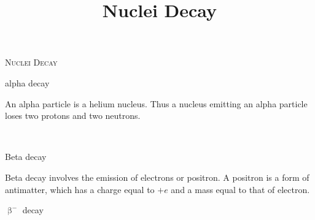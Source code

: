 \documentclass[12 pt]{book}
\title{Nuclei Decay}
\date{}
\newcommand*\Times{\fontfamily{ptm}\selectfont}
\newenvironment{my-title}
{
	\begin{center}
	\begin{itshape}
	\Large\Times\textit{}
}
{
	\end{itshape}
	\end{center}
}
\newenvironment{definition}
{
	\begin{center}
	\begin{itshape}
	\large\Times\textit{}
}
{
	\end{itshape}
	\end{center}
}
\newenvironment{note}
{
	\begin{center}
	\begin{itshape}
	\small\Times\textit{}
}
{
	\end{itshape}
	\end{center}
}
\newenvironment{chemistry}
{
	\begin{center}
	\begin{itshape}
	\Large\Times\textit{}
}
{
	\end{itshape}
	\end{center}
}
\begin{document}


\begin{center}
	\textsc{Nuclei Decay}\\[10mm]
\end{center}


\begin{my-title}
alpha decay
\end{my-title}

\begin{definition}
An alpha particle is a helium nucleus. Thus a nucleus emitting an alpha particle loses two protons and two neutrons.
\end{definition}


\begin{chemistry}
 \\[7.5 mm]
\end{chemistry}

\vspace*{10mm}


\begin{my-title}
Beta decay
\end{my-title}

\begin{definition}
Beta decay involves the emission of electrons or positron. A positron is a form of antimatter, which has a charge equal to $+e$ and a mass equal to that of electron.
\end{definition}


\begin{note}
\end{note}


\vspace*{10mm}

\begin{my-title}
$\upbeta^-$ decay
\end{my-title}
\end{document}
